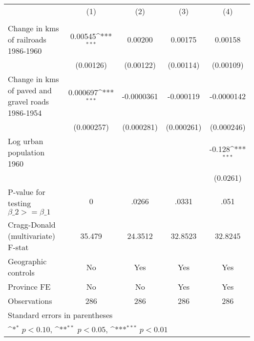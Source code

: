 {
\def\sym#1{\ifmmode^{#1}\else\(^{#1}\)\fi}
\begin{tabular}{l*{4}{c}}
\hline\hline
                &\multicolumn{1}{c}{(1)}&\multicolumn{1}{c}{(2)}&\multicolumn{1}{c}{(3)}&\multicolumn{1}{c}{(4)}\\
                &\multicolumn{1}{c}{}&\multicolumn{1}{c}{}&\multicolumn{1}{c}{}&\multicolumn{1}{c}{}\\
\hline
Change in kms of railroads 1986-1960&  0.00545\sym{***}&  0.00200         &  0.00175         &  0.00158         \\
                &(0.00126)         &(0.00122)         &(0.00114)         &(0.00109)         \\
[1em]
Change in kms of paved and gravel roads 1986-1954& 0.000697\sym{***}&-0.0000361         &-0.000119         &-0.0000142         \\
                &(0.000257)         &(0.000281)         &(0.000261)         &(0.000246)         \\
[1em]
Log urban population 1960&                  &                  &                  &   -0.128\sym{***}\\
                &                  &                  &                  & (0.0261)         \\
\hline
P-value for testing $\beta\_{2} >= \beta\_{1}$&        0         &    .0266         &    .0331         &     .051         \\
Cragg-Donald (multivariate) F-stat&   35.479         &  24.3512         &  32.8523         &  32.8245         \\
Geographic controls&       No         &      Yes         &      Yes         &      Yes         \\
Province FE     &       No         &       No         &      Yes         &      Yes         \\
Observations    &      286         &      286         &      286         &      286         \\
\hline\hline
\multicolumn{5}{l}{\footnotesize Standard errors in parentheses}\\
\multicolumn{5}{l}{\footnotesize \sym{*} \(p<0.10\), \sym{**} \(p<0.05\), \sym{***} \(p<0.01\)}\\
\end{tabular}
}
